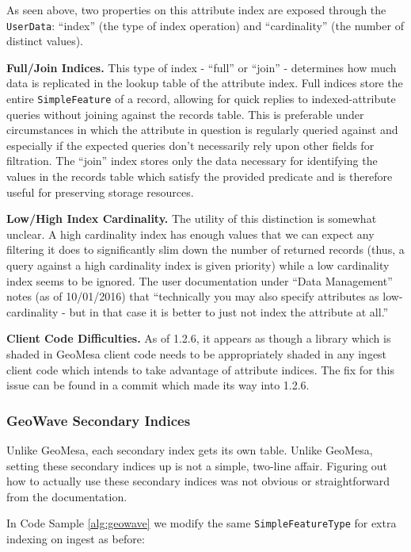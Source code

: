 As seen above, two properties on this attribute index are exposed through the \texttt{UserData}: ``index'' (the type of index operation) and ``cardinality'' (the number of distinct values).

{\bf Full/Join Indices.}
This type of index - ``full'' or ``join'' - determines how much data is replicated in the lookup table of the attribute index.
Full indices store the entire \texttt{SimpleFeature} of a record, allowing for quick replies to indexed-attribute queries without joining against the records table.
This is preferable under circumstances in which the attribute in question is regularly queried against and especially if the expected queries don't necessarily rely upon other fields for filtration.
The ``join'' index stores only the data necessary for identifying the values in the records table which satisfy the provided predicate and is therefore useful for preserving storage resources.

{\bf Low/High Index Cardinality.}
The utility of this distinction is somewhat unclear.
A high cardinality index has enough values that we can expect any filtering it does to significantly slim down the number of returned records (thus, a query against a high cardinality index is given priority) while a low cardinality index seems to be ignored.
The user documentation under ``Data Management'' notes (as of 10/01/2016) that ``technically you may also specify attributes as low-cardinality - but in that case it is better to just not index the attribute at all.''

{\bf Client Code Difficulties.}
As of 1.2.6, it appears as though a library which is shaded in GeoMesa client code needs to be appropriately shaded in any ingest client code which intends to take advantage of attribute indices.
The fix for this issue can be found in a commit which made its way into 1.2.6.

\subsubsection{GeoWave Secondary Indices}
  
Unlike GeoMesa, each secondary index gets its own table. Unlike GeoMesa, setting these secondary indices up is not a simple, two-line affair. Figuring out how to actually use these secondary indices was not obvious or straightforward from the documentation.

In Code Sample \ref{alg:geowave}  we modify the same \texttt{SimpleFeatureType} for extra indexing on ingest as before:

